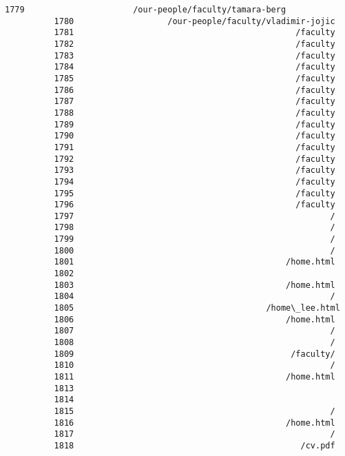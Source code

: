 \documentclass[11pt]{article}
\begin{document}
\begin{Verbatim}[commandchars=\\\{\}]
          1779                      /our-people/faculty/tamara-berg
          1780                   /our-people/faculty/vladimir-jojic
          1781                                             /faculty
          1782                                             /faculty
          1783                                             /faculty
          1784                                             /faculty
          1785                                             /faculty
          1786                                             /faculty
          1787                                             /faculty
          1788                                             /faculty
          1789                                             /faculty
          1790                                             /faculty
          1791                                             /faculty
          1792                                             /faculty
          1793                                             /faculty
          1794                                             /faculty
          1795                                             /faculty
          1796                                             /faculty
          1797                                                    /
          1798                                                    /
          1799                                                    /
          1800                                                    /
          1801                                           /home.html
          1802                                                     
          1803                                           /home.html
          1804                                                    /
          1805                                       /home\_lee.html
          1806                                           /home.html
          1807                                                    /
          1808                                                    /
          1809                                            /faculty/
          1810                                                    /
          1811                                           /home.html
          1813                                                     
          1814                                                     
          1815                                                    /
          1816                                           /home.html
          1817                                                    /
          1818                                              /cv.pdf

\end{Verbatim}
\end{document}
